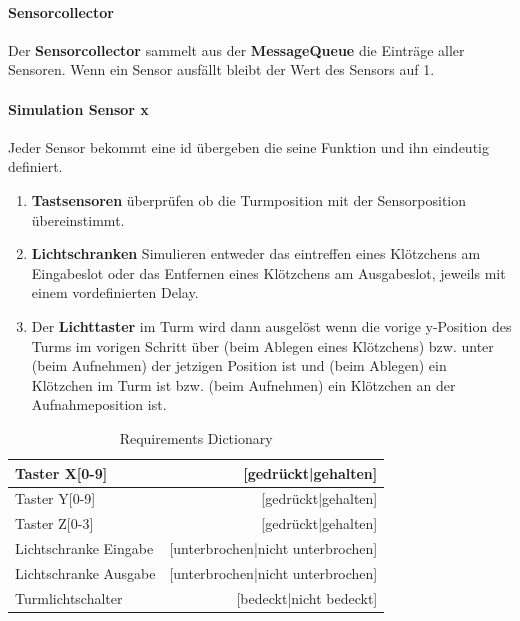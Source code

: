 \paragraph{Sensorcollector}
Der \textbf{Sensorcollector} sammelt aus der \textbf{MessageQueue} die Einträge aller Sensoren. Wenn ein Sensor ausfällt bleibt der Wert des Sensors auf 1.

\paragraph{Simulation Sensor x}
Jeder Sensor bekommt eine id übergeben die seine Funktion und ihn eindeutig definiert. 
\begin{enumerate}
\item \textbf{Tastsensoren} überprüfen ob die Turmposition mit der Sensorposition übereinstimmt.
\item \textbf{Lichtschranken} Simulieren entweder das eintreffen eines Klötzchens am Eingabeslot oder das Entfernen eines Klötzchens am Ausgabeslot, jeweils mit einem vordefinierten Delay. 
\item Der \textbf{Lichttaster} im Turm wird dann ausgelöst wenn die vorige y-Position des Turms im vorigen Schritt über (beim Ablegen eines Klötzchens) bzw. unter (beim Aufnehmen) der jetzigen Position ist und (beim Ablegen) ein Klötzchen im Turm ist bzw. (beim Aufnehmen) ein Klötzchen an der Aufnahmeposition ist.

\end{enumerate}
\begin{table}[h]
\centering
\begin{tabular}{|l|r|}
\hline
Taster X[0-9] &  [gedrückt|gehalten] \\
\hline
Taster Y[0-9] &  [gedrückt|gehalten] \\
\hline
Taster Z[0-3] &  [gedrückt|gehalten] \\
\hline
Lichtschranke Eingabe & [unterbrochen|nicht unterbrochen] \\
\hline
Lichtschranke Ausgabe & [unterbrochen|nicht unterbrochen] \\
\hline
Turmlichtschalter & [bedeckt|nicht bedeckt]\\
\hline
\end{tabular}
\caption{Requirements Dictionary}
\label{tab:Requirements Dictionary}
\end{table}
